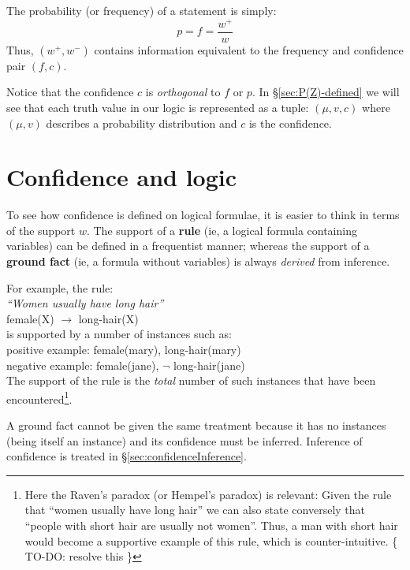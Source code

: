 The probability (or frequency) of a statement is simply:
\begin{equation}
p = f = \frac{w^+}{w}
\end{equation}
Thus, $(w^+,w^-)$ contains information equivalent to the frequency and confidence pair $(f,c)$.

Notice that the confidence $c$ is \textit{orthogonal} to $f$ or $p$.  In \S\ref{sec:P(Z)-defined} we will see that each truth value in our logic is represented as a tuple: $(\mu, v, c)$ where $(\mu, v)$ describes a probability distribution and $c$ is the confidence.

\section{Confidence and logic}

To see how confidence is defined on logical formulae, it is easier to think in terms of the support $w$.  The support of a \textbf{rule} (ie, a logical formula containing variables) can be defined in a frequentist manner;  whereas the support of a \textbf{ground fact} (ie, a formula without variables) is always \textit{derived} from inference.

For example, the rule:\\
\hspace*{1cm} \textit{``Women usually have long hair''}\\
\hspace*{1cm} female(X) $\rightarrow$ long-hair(X)\\
is supported by a number of instances such as:\\
\hspace*{1cm} positive example: \hspace*{1cm} female(mary), long-hair(mary)\\
\hspace*{1cm} negative example: \hspace*{1cm} female(jane), $\neg$ long-hair(jane)\\
The support of the rule is the \textit{total} number of such instances that have been encountered\footnote{Here the Raven's paradox (or Hempel's paradox) is relevant:  Given the rule that ``women usually have long hair'' we can also state conversely that ``people with short hair are usually not women''.  Thus, a man with short hair would become a supportive example of this rule, which is counter-intuitive.  \{ TO-DO:  resolve this \}}.

A ground fact cannot be given the same treatment because it has no instances (being itself an instance) and its confidence must be inferred.  Inference of confidence is treated in \S\ref{sec:confidenceInference}.

